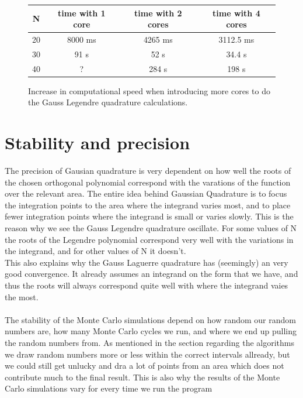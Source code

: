 \documentclass[a4paper,english, 10pt, twoside]{article}
\begin{document}
\begin{figure}[H]
\centering 
\begin{tabular}{|c|c|c|c|}
\hline
N & time with 1 core & time with 2 cores & time with 4 cores \\
\hline
20 &  8000 ms & 4265 ms& 3112.5 ms\\
30 & 91 s & 52 s& 34.4 s \\
40 & ? & 284 s & 198 s  \\
\hline
\end{tabular}
\caption{Increase in computational speed when introducing more cores to do the Gauss Legendre quadrature calculations.}
\label{table3}
\end{figure}

\section*{Stability and precision}
The precision of Gausian quadrature is very dependent on how well the roots of the chosen orthogonal polynomial correspond with 
the varations of the function over the relevant area. The entire idea behind Gaussian Quadrature is to focus the integration 
points to the area where the integrand varies most, and to place fewer integration points where the integrand is small or varies 
slowly. This is the reason why we see the Gauss Legendre quadrature oscillate. For some values of N the roots of the Legendre 
polynomial correspond very well with the variations in the integrand, and for other values of N it doesn't.\\
This also explains why the Gauss Laguerre quadrature has (seemingly) an very good convergence. It already assumes an integrand on 
the form that we have, and thus the roots will always correspond quite well with where the integrand vaies the most.\\ \\

The stability of the Monte Carlo simulations depend on how random our random numbers are, how many Monte Carlo cycles 
we run, and where we end up pulling the random numbers from. As mentioned in the section regarding the algorithms we draw random 
numbers more or less within the correct intervals allready, but we could still get unlucky and dra a lot of points from an area 
which does not contribute much to the final result. This is also why the results of the Monte Carlo simulations vary for every time 
we run the program
\end{document}
